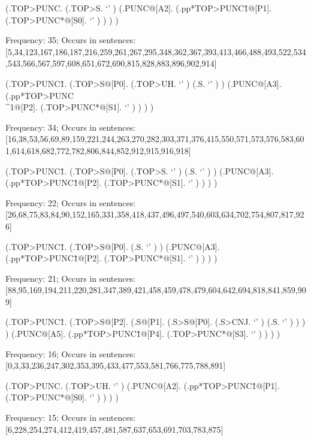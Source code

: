 \documentclass[10pt]{article}
\begin{document}
\begin{parsetree} (.TOP>PUNC. (.TOP>S. `' ) (.PUNC@[A2]. (.pp*TOP>PUNC\^1@[P1]. (.TOP>PUNC*@[S0]. `' ) ) ) ) \end{parsetree}

Frequency: 35; Occurs in sentences: [5,34,123,167,186,187,216,259,261,267,295,348,362,367,393,413,466,488,493,522,534,543,566,567,597,608,651,672,690,815,828,883,896,902,914]


\begin{parsetree} (.TOP>PUNC\^1. (.TOP>S@[P0]. (.TOP>UH. `' ) (.S. `' ) ) (.PUNC@[A3]. (.pp*TOP>PUNC\\^1@[P2]. (.TOP>PUNC*@[S1]. `' ) ) ) ) \end{parsetree}

Frequency: 34; Occurs in sentences: [16,38,53,56,69,89,159,221,244,263,270,282,303,371,376,415,550,571,573,576,583,601,614,618,682,772,782,806,844,852,912,915,916,918]


\begin{parsetree} (.TOP>PUNC\^1. (.TOP>S@[P0]. (.TOP>S. `' ) (.S. `' ) ) (.PUNC@[A3]. (.pp*TOP>PUNC\^1@[P2]. (.TOP>PUNC*@[S1]. `' ) ) ) ) \end{parsetree}

Frequency: 22; Occurs in sentences: [26,68,75,83,84,90,152,165,331,358,418,437,496,497,540,603,634,702,754,807,817,926]


\begin{parsetree} (.TOP>PUNC\^1. (.TOP>S@[P0]. (.S. `' ) ) (.PUNC@[A3]. (.pp*TOP>PUNC\^1@[P2]. (.TOP>PUNC*@[S1]. `' ) ) ) ) \end{parsetree}

Frequency: 21; Occurs in sentences: [88,95,169,194,211,220,281,347,389,421,458,459,478,479,604,642,694,818,841,859,909]


\begin{parsetree} (.TOP>PUNC\^1. (.TOP>S@[P2]. (.S@[P1]. (.S>S@[P0]. (.S>CNJ. `' ) (.S. `' ) ) ) ) (.PUNC@[A5]. (.pp*TOP>PUNC\^1@[P4]. (.TOP>PUNC*@[S3]. `' ) ) ) ) \end{parsetree}

Frequency: 16; Occurs in sentences: [0,3,33,236,247,302,353,395,433,477,553,581,766,775,788,891]


\begin{parsetree} (.TOP>PUNC. (.TOP>UH. `' ) (.PUNC@[A2]. (.pp*TOP>PUNC\^1@[P1]. (.TOP>PUNC*@[S0]. `' ) ) ) ) \end{parsetree}

Frequency: 15; Occurs in sentences: [6,228,254,274,412,419,457,481,587,637,653,691,703,783,875]
\end{document}
